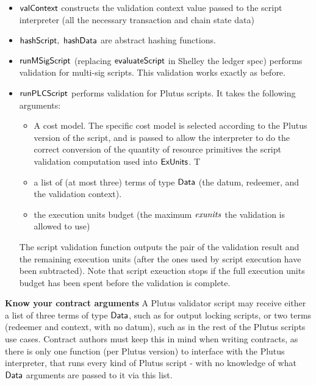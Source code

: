 \begin{itemize}
  \item $\mathsf{valContext}$ constructs the validation context value passed
  to the script interpreter (all the necessary transaction and chain state data)
  \item $\mathsf{hashScript},~ \mathsf{hashData}$ are abstract hashing functions.
  \item $\mathsf{runMSigScript}$ (replacing $\mathsf{evaluateScript}$ in Shelley the ledger spec) performs
  validation for multi-sig scripts.
  This validation works exactly as before.
  \item $\mathsf{runPLCScript}$ performs validation for Plutus scripts. It takes the following
  arguments:
  \begin{itemize}
  \item A cost model. The specific cost model is selected according to the Plutus
  version of the script, and is passed to allow the interpreter to do the
  correct conversion of the quantity of resource primitives the script validation
  computation used into $\mathsf{ExUnits}$. T
  \item
  a list of (at most three) terms of type $\mathsf{Data}$ (the datum, redeemer,
  and the validation context).
  \item the execution units budget (the maximum $\mathit{exunits}$
  the validation is allowed to use)
  \end{itemize}
  The script validation function outputs the pair of the validation result
  and the remaining execution units (after the ones used by script execution
  have been subtracted). Note that script exeuction stops if the full execution
  units budget has been spent before the validation is complete.
\end{itemize}

\begin{note}
  \textbf{Know your contract arguments}
A Plutus validator script may receive either a list of three terms of type $\mathsf{Data}$,
such as for output locking scripts, or two terms (redeemer and context, with
no datum), such as in the rest of the Plutus scripts use cases.
Contract authors must keep this in mind when writing contracts, as there is
only one function (per Plutus version) to interface with the Plutus interpreter,
that runs every kind of Plutus script - with no knowledge of what $\mathsf{Data}$ arguments
are passed to it via this list.
\end{note}

